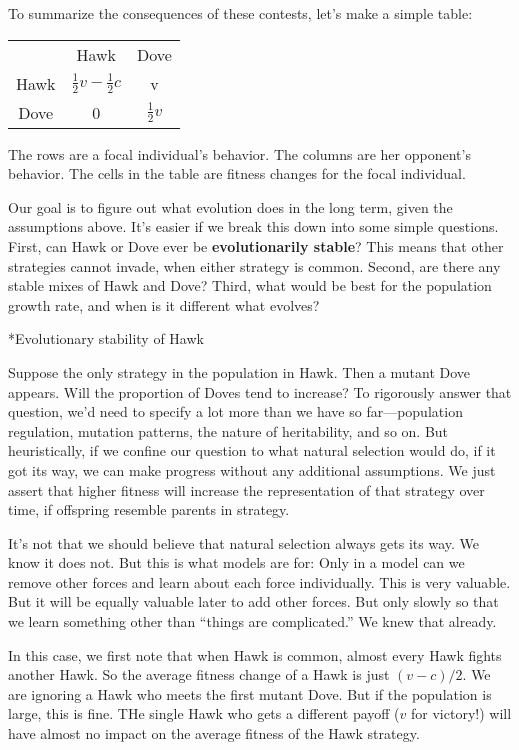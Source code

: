 \documentclass[10pt,reqno]{amsbook}
\makeatletter
\newcommand{\bemph}[1]{{\textbf{\textcolor{bemphcol}{#1}}}}
\renewcommand\subsection{\@startsection{subsection}{2}
\z@{.5\linespacing\@plus.7\linespacing}{-.5em}%
{\normalfont\normalsize\bfseries}}
\numberwithin{equation}{chapter}
\makeatother
\begin{document}
To summarize the consequences of these contests, let's make a simple table:
\begin{center}
\begin{tabular}{ccc}
	& Hawk & Dove \\
  Hawk & $\tfrac{1}{2}v-\tfrac{1}{2}c$ & v \\
  Dove & 0 & $\tfrac{1}{2}v$
\end{tabular}
\end{center}
The rows are a focal individual's behavior. The columns are her opponent's behavior. The cells in the table are fitness changes for the focal individual.

Our goal is to figure out what evolution does in the long term, given the assumptions above. It's easier if we break this down into some simple questions.  First, can Hawk or Dove ever be \bemph{evolutionarily stable}? This means that other strategies cannot invade, when either strategy is common. Second, are there any stable mixes of Hawk and Dove? Third, what would be best for the population growth rate, and when is it different what evolves?

\subsection*{Evolutionary stability of Hawk}

Suppose the only strategy in the population in Hawk. Then a mutant Dove appears. Will the proportion of Doves tend to increase? To rigorously answer that question, we'd need to specify a lot more than we have so far---population regulation, mutation patterns, the nature of heritability, and so on. But heuristically, if we confine our question to what natural selection would do, if it got its way, we can make progress without any additional assumptions. We just assert that higher fitness will increase the representation of that strategy over time, if offspring resemble parents in strategy.

It's not that we should believe that natural selection always gets its way. We know it does not. But this is what models are for: Only in a model can we remove other forces and learn about each force individually. This is very valuable. But it will be equally valuable later to add other forces. But only slowly so that we learn something other than ``things are complicated.'' We knew that already.

In this case, we first note that when Hawk is common, almost every Hawk fights another Hawk. So the average fitness change of a Hawk is just $(v-c)/2$. We are ignoring a Hawk who meets the first mutant Dove. But if the population is large, this is fine. THe single Hawk who gets a different payoff ($v$ for victory!) will have almost no impact on the average fitness of the Hawk strategy.
\end{document}
